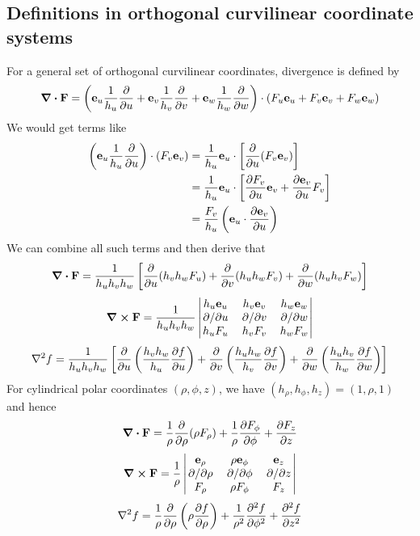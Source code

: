 \subsection{Definitions in orthogonal curvilinear coordinate systems}
For a general set of orthogonal curvilinear coordinates, divergence is defined by
\[
	\div{\vb F} = \left( \vb e_u \frac{1}{h_u} \pdv{u} + \vb e_v \frac{1}{h_v} \pdv{v} + \vb e_w \frac{1}{h_w} \pdv{w} \right) \cdot \left( F_u \vb e_u + F_v \vb e_v + F_w \vb e_w \right)
\]
We would get terms like
\begin{align*}
	\left( \vb e_u \frac{1}{h_u} \pdv{u} \right) \cdot (F_v \vb e_v) & = \frac{1}{h_u} \vb e_u \cdot \left[ \pdv{u}(F_v \vb e_v) \right]                       \\
	                                                                 & = \frac{1}{h_u} \vb e_u \cdot \left[ \pdv{F_v}{u}\vb e_v + \pdv{\vb e_v}{u} F_v \right] \\
	                                                                 & = \frac{F_v}{h_u} \left( \vb e_u \cdot \pdv{\vb e_v}{u} \right)
\end{align*}
We can combine all such terms and then derive that
\[
	\div{\vb F} = \frac{1}{h_u h_v h_w} \left[ \pdv{u} (h_v h_w F_u) + \pdv{v} (h_u h_w F_v) + \pdv{w} (h_u h_v F_w) \right]
\]
\[
	\curl{\vb F} = \frac{1}{h_u h_v h_w} \begin{vmatrix}
		h_u \vb e_u & h_v \vb e_v & h_w \vb e_w \\
		\pdv*{u}    & \pdv*{v}    & \pdv*{w}    \\
		h_u F_u     & h_v F_v     & h_w F_w
	\end{vmatrix}
\]
\[
	\laplacian{f} = \frac{1}{h_u h_v h_w} \left[ \pdv{u} \left( \frac{h_v h_w}{h_u} \pdv{f}{u} \right) + \pdv{v} \left( \frac{h_u h_w}{h_v} \pdv{f}{v} \right) + \pdv{w} \left( \frac{h_u h_v}{h_w} \pdv{f}{w} \right) \right]
\]
For cylindrical polar coordinates \((\rho, \phi, z)\), we have \((h_\rho, h_\phi, h_z) = (1, \rho, 1)\) and hence
\[
	\div{\vb F} = \frac{1}{\rho} \pdv{\rho} (\rho F_\rho) + \frac{1}{\rho} \pdv{F_\phi}{\phi} + \pdv{F_z}{z}
\]
\[
	\curl{\vb F} = \frac{1}{\rho} \begin{vmatrix}
		\vb e_\rho  & \rho \vb e_\phi & \vb e_z  \\
		\pdv*{\rho} & \pdv*{\phi}     & \pdv*{z} \\
		F_\rho      & \rho F_\phi     & F_z
	\end{vmatrix}
\]
\[
	\laplacian{f} = \frac{1}{\rho} \pdv{\rho} \left( \rho \pdv{f}{\rho} \right) + \frac{1}{\rho^2} \pdv[2]{f}{\phi} + \pdv[2]{f}{z}
\]

